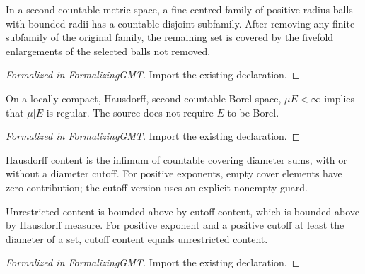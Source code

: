 \begin{theorem}
\label{gmt:vitali}
\leanok
In a second-countable metric space, a fine centred family of positive-radius balls with bounded radii has a countable disjoint subfamily. After removing any finite subfamily of the original family, the remaining set is covered by the fivefold enlargements of the selected balls not removed.
\end{theorem}
\begin{proof}[Formalized in FormalizingGMT]
\leanok
Import the existing declaration.
\end{proof}

\begin{theorem}
\label{gmt:finite-restriction}
\leanok
On a locally compact, Hausdorff, second-countable Borel space, $\mu E<\infty$ implies that $\mu|E$ is regular. The source does not require $E$ to be Borel.
\end{theorem}
\begin{proof}[Formalized in FormalizingGMT]
\leanok
Import the existing declaration.
\end{proof}

\begin{definition}
\label{gmt:hausdorff-content}
\leanok
Hausdorff content is the infimum of countable covering diameter sums, with or without a diameter cutoff. For positive exponents, empty cover elements have zero contribution; the cutoff version uses an explicit nonempty guard.
\end{definition}

\begin{lemma}
\label{gmt:content-comparison}
\leanok
{}
Unrestricted content is bounded above by cutoff content, which is bounded above by Hausdorff measure. For positive exponent and a positive cutoff at least the diameter of a set, cutoff content equals unrestricted content.
\end{lemma}
\begin{proof}[Formalized in FormalizingGMT]
\leanok
Import the existing declaration.
\end{proof}

